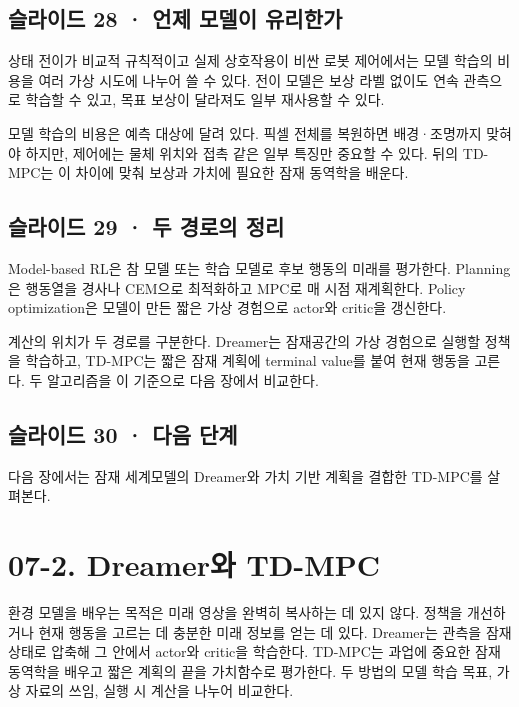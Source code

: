 \documentclass[11pt,a4paper]{article}
\begin{document}
\subsection{슬라이드 28 · 언제 모델이 유리한가}

상태 전이가 비교적 규칙적이고 실제 상호작용이 비싼 로봇 제어에서는 모델 학습의 비용을 여러 가상 시도에 나누어 쓸 수 있다. 전이 모델은 보상 라벨 없이도 연속 관측으로 학습할 수 있고, 목표 보상이 달라져도 일부 재사용할 수 있다.\par

모델 학습의 비용은 예측 대상에 달려 있다. 픽셀 전체를 복원하면 배경·조명까지 맞혀야 하지만, 제어에는 물체 위치와 접촉 같은 일부 특징만 중요할 수 있다. 뒤의 TD-MPC는 이 차이에 맞춰 보상과 가치에 필요한 잠재 동역학을 배운다.\par

\subsection{슬라이드 29 · 두 경로의 정리}

Model-based RL은 참 모델 또는 학습 모델로 후보 행동의 미래를 평가한다. Planning은 행동열을 경사나 CEM으로 최적화하고 MPC로 매 시점 재계획한다. Policy optimization은 모델이 만든 짧은 가상 경험으로 actor와 critic을 갱신한다.\par

계산의 위치가 두 경로를 구분한다. Dreamer는 잠재공간의 가상 경험으로 실행할 정책을 학습하고, TD-MPC는 짧은 잠재 계획에 terminal value를 붙여 현재 행동을 고른다. 두 알고리즘을 이 기준으로 다음 장에서 비교한다.\par

\subsection{슬라이드 30 · 다음 단계}

다음 장에서는 잠재 세계모델의 Dreamer와 가치 기반 계획을 결합한 TD-MPC를 살펴본다.\par

\clearpage
\section{07-2. Dreamer와 TD-MPC}


환경 모델을 배우는 목적은 미래 영상을 완벽히 복사하는 데 있지 않다. 정책을 개선하거나 현재 행동을 고르는 데 충분한 미래 정보를 얻는 데 있다. Dreamer는 관측을 잠재 상태로 압축해 그 안에서 actor와 critic을 학습한다. TD-MPC는 과업에 중요한 잠재 동역학을 배우고 짧은 계획의 끝을 가치함수로 평가한다. 두 방법의 모델 학습 목표, 가상 자료의 쓰임, 실행 시 계산을 나누어 비교한다.\par
\end{document}
